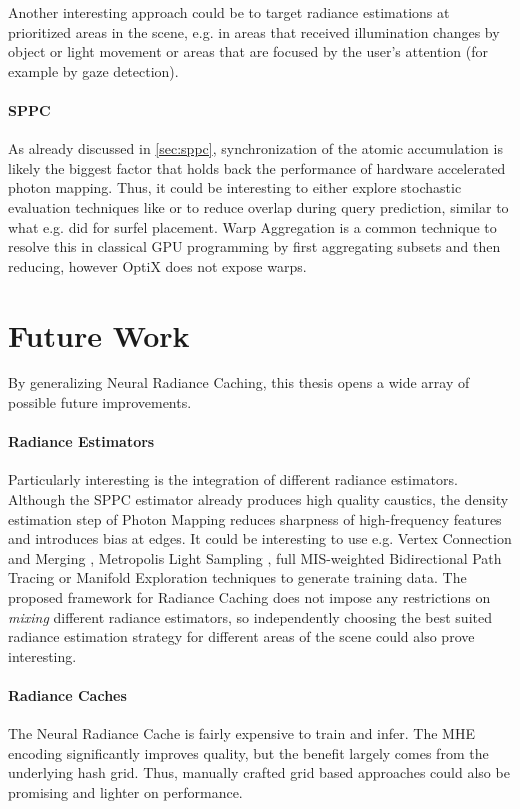 Another interesting approach could be to target radiance estimations at prioritized areas in the scene, e.g. in areas that received illumination changes by object or light movement or areas that are focused by the user's attention (for example by gaze detection).

\paragraph{SPPC} As already discussed in \cref{sec:sppc}, synchronization of the atomic accumulation is likely the biggest factor that holds back the performance of hardware accelerated photon mapping.
Thus, it could be interesting to either explore stochastic evaluation techniques like \textcite{kern2023} or to reduce overlap during query prediction, similar to what e.g. \textcite{stachowiak2018} did for surfel placement.
Warp Aggregation is a common technique to resolve this in classical GPU programming by first aggregating subsets and then reducing, however OptiX does not expose warps.

\section{Future Work}
By generalizing Neural Radiance Caching, this thesis opens a wide array of possible future improvements.

\paragraph{Radiance Estimators}
Particularly interesting is the integration of different radiance estimators.
Although the SPPC estimator already produces high quality caustics, the density estimation step of Photon Mapping reduces sharpness of high-frequency features and introduces bias at edges.
It could be interesting to use e.g. Vertex Connection and Merging \parencite{georgiev2012}, Metropolis Light Sampling \parencite{veach1997a}, full MIS-weighted Bidirectional Path Tracing \parencite{lafortune1993,veach1997} or Manifold Exploration techniques \parencite{jakob2012} to generate training data.
The proposed framework for Radiance Caching does not impose any restrictions on \emph{mixing} different radiance estimators, so independently choosing the best suited radiance estimation strategy for different areas of the scene could also prove interesting.

\paragraph{Radiance Caches}
The Neural Radiance Cache is fairly expensive to train and infer.
The MHE encoding significantly improves quality, but the benefit largely comes from the underlying hash grid.
Thus, manually crafted grid based approaches could also be promising and lighter on performance.

